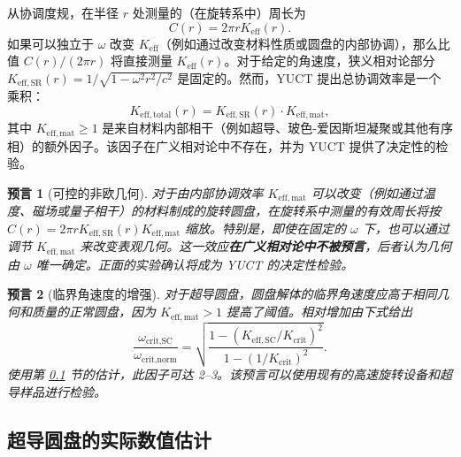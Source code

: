 \documentclass[12pt,a4paper]{article}
\newtheorem{prediction}{预言}[section]
\begin{document}
	从协调度规，在半径 \(r\) 处测量的（在旋转系中）周长为
	\[
	C(r) = 2\pi r K_{\mathrm{eff}}(r).
	\]
	如果可以独立于 \(\omega\) 改变 \(K_{\mathrm{eff}}\)（例如通过改变材料性质或圆盘的内部协调），那么比值 \(C(r)/(2\pi r)\) 将直接测量 \(K_{\mathrm{eff}}(r)\)。对于给定的角速度，狭义相对论部分 \(K_{\mathrm{eff,SR}}(r) = 1/\sqrt{1-\omega^2 r^2/c^2}\) 是固定的。然而，YUCT 提出总协调效率是一个乘积：
	\[
	K_{\mathrm{eff,total}}(r) = K_{\mathrm{eff,SR}}(r) \cdot K_{\mathrm{eff,mat}},
	\]
	其中 \(K_{\mathrm{eff,mat}} \ge 1\) 是来自材料内部相干（例如超导、玻色-爱因斯坦凝聚或其他有序相）的额外因子。该因子在广义相对论中不存在，并为 YUCT 提供了决定性的检验。
	
	\begin{prediction}[可控的非欧几何]
		对于由内部协调效率 \(K_{\mathrm{eff,mat}}\) 可以改变（例如通过温度、磁场或量子相干）的材料制成的旋转圆盘，在旋转系中测量的有效周长将按 \(C(r) = 2\pi r K_{\mathrm{eff,SR}}(r) K_{\mathrm{eff,mat}}\) 缩放。特别是，即使在固定的 \(\omega\) 下，也可以通过调节 \(K_{\mathrm{eff,mat}}\) 来改变表观几何。这一效应\textbf{在广义相对论中不被预言}，后者认为几何由 \(\omega\) 唯一确定。正面的实验确认将成为 YUCT 的决定性检验。
	\end{prediction}
	
	\begin{prediction}[临界角速度的增强]
		对于超导圆盘，圆盘解体的临界角速度应高于相同几何和质量的正常圆盘，因为 \(K_{\mathrm{eff,mat}} > 1\) 提高了阈值。相对增加由下式给出
		\[
		\frac{\omega_{\text{crit,SC}}}{\omega_{\text{crit,norm}}} = \sqrt{ \frac{1 - (K_{\mathrm{eff,SC}}/K_{\mathrm{crit}})^2}{1 - (1/K_{\mathrm{crit}})^2} }.
		\]
		使用第 \ref{subsec:numerical} 节的估计，此因子可达 2–3。该预言可以使用现有的高速旋转设备和超导样品进行检验。
	\end{prediction}
	
	\subsection{超导圆盘的实际数值估计}
	\label{subsec:numerical}
	
\end{document}
